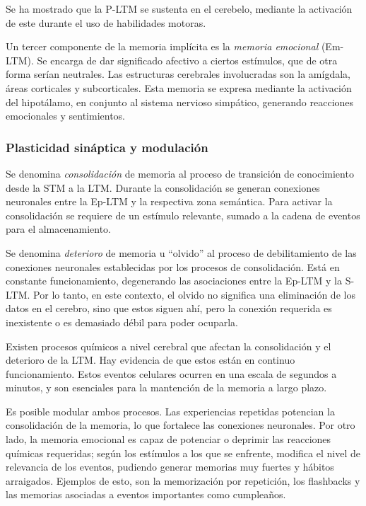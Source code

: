 Se ha mostrado que la P-LTM se sustenta en el cerebelo, mediante la activación de este durante el uso de habilidades motoras.

Un tercer componente de la memoria implícita es la \textit{memoria emocional} (Em-LTM). Se encarga de dar significado afectivo a ciertos  estímulos, que de otra forma serían neutrales. Las estructuras cerebrales involucradas son la amígdala, áreas corticales y subcorticales. Esta memoria se expresa mediante la activación del hipotálamo, en conjunto al sistema nervioso simpático, generando reacciones emocionales y sentimientos.


\subsubsection{Plasticidad sináptica y modulación}
Se denomina \textit{consolidación} de memoria al proceso de transición de conocimiento desde la STM a la LTM. Durante la consolidación se generan conexiones neuronales entre la Ep-LTM y la respectiva zona semántica. Para activar la consolidación se requiere de un estímulo relevante, sumado a la cadena de eventos para el almacenamiento.

Se denomina \textit{deterioro} de memoria u ``olvido'' al proceso de debilitamiento de las conexiones neuronales establecidas por los procesos de consolidación. Está en constante funcionamiento, degenerando las asociaciones entre la Ep-LTM y la S-LTM. Por lo tanto, en este contexto, el olvido no significa una eliminación de los datos en el cerebro, sino que estos siguen ahí, pero la conexión requerida es inexistente o es demasiado débil para poder ocuparla.

Existen procesos químicos a nivel cerebral que afectan la consolidación y el deterioro de la LTM. Hay evidencia de que estos están en continuo funcionamiento. Estos eventos celulares ocurren en una escala de segundos a minutos, y son esenciales para la mantención de la memoria a largo plazo.

Es posible modular ambos procesos. Las experiencias repetidas potencian la consolidación de la memoria, lo que fortalece las conexiones neuronales. Por otro lado, la memoria emocional es capaz de potenciar o deprimir las reacciones químicas requeridas; según los estímulos a los que se enfrente, modifica el nivel de relevancia de los eventos, pudiendo generar memorias muy fuertes y hábitos arraigados. Ejemplos de esto, son la memorización por repetición, los flashbacks y las memorias asociadas a eventos importantes como cumpleaños.

